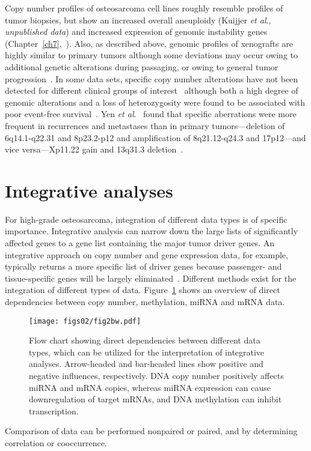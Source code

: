 Copy number profiles of osteosarcoma cell lines roughly
resemble profiles of tumor biopsies, but show an increased
overall aneuploidy (Kuijjer {\it et al}., {\it unpublished data}) and
increased expression of genomic instability genes (Chapter~\ref{ch7},~\cite{kuijjer2012identification}). Also, as
described above, genomic profiles of xenografts are highly
similar to primary tumors although some deviations may
occur owing to additional genetic alterations during passaging,
or owing to general tumor progression~\cite{kresse2011preclinical}. In some data
sets, specific copy number alterations have not been detected
for different clinical groups of interest~\cite{kuijjer2012identification} although both a high
degree of genomic alterations and a loss of heterozygosity
were found to be associated with poor event\hyp{}free survival~\cite{kuijjer2012identification,smida2010genomic}.
Yen {\it et al}.~\cite{yen2009identification} found that specific aberrations were more frequent
in recurrences and metastases than in primary
tumors---deletion of 6q14.1-q22.31 and 8p23.2-p12 and
amplification of 8q21.12-q24.3 and 17p12---and vice versa---Xp11.22 gain and 13q31.3 deletion~\cite{yen2009identification}.

%
\section{Integrative analyses}\label{integrative2}
For high-grade osteosarcoma, integration of different data
types is of specific importance. Integrative analysis can narrow
down the large lists of significantly affected genes to a
gene list containing the major tumor driver genes. An integrative
approach on copy number and gene expression data,
for example, typically returns a more specific list of driver
genes because passenger- and tissue\hyp{}specific genes will be
largely eliminated~\cite{lee2008integrative}. Different methods exist for the integration
of different types of data. Figure~\ref{fig2.2} shows an overview of
direct dependencies between copy number, methylation,
miRNA and mRNA data.
%
\begin{figure}[htbp]
  \centering
  \begin{minipage}[b]{0.50\linewidth}
    \texttt{[image: figs02/fig2bw.pdf]}	%
  \end{minipage}
    \hfill
  \begin{minipage}[b]{0.46\linewidth}
    \caption{Flow chart showing
direct dependencies between different data types, which can be
utilized for the interpretation of integrative analyses. Arrow\hyp{}headed
and bar\hyp{}headed lines show positive and negative influences,
respectively. DNA copy number positively affects miRNA and mRNA
copies, whereas miRNA expression can cause downregulation of
target mRNAs, and DNA methylation can inhibit transcription.}
     \label{fig2.2}
     \end{minipage}
\end{figure}
%
Comparison of data can be performed
nonpaired or paired, and by determining correlation
or cooccurrence.

